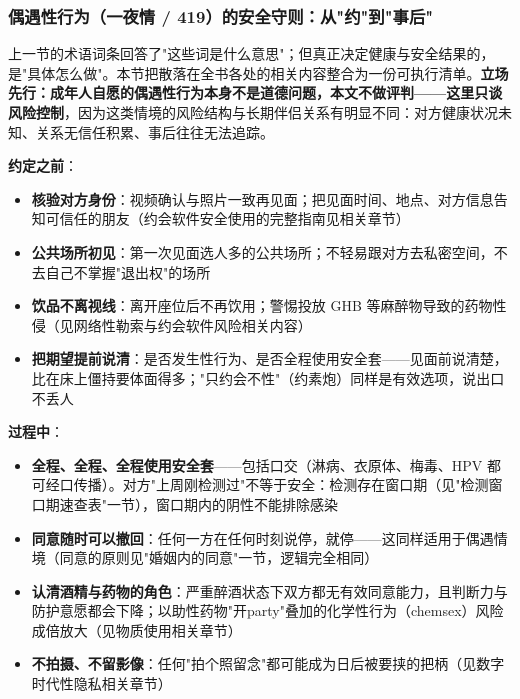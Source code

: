 \subsubsection{偶遇性行为（一夜情 / 419）的安全守则：从"约"到"事后"}

上一节的术语词条回答了"这些词是什么意思"；但真正决定健康与安全结果的，是"具体怎么做"。本节把散落在全书各处的相关内容整合为一份可执行清单。\textbf{立场先行：成年人自愿的偶遇性行为本身不是道德问题，本文不做评判——这里只谈风险控制}，因为这类情境的风险结构与长期伴侣关系有明显不同：对方健康状况未知、关系无信任积累、事后往往无法追踪。

\vspace{0.5em}
\noindent\textbf{约定之前}：

\begin{itemize}
	\item \textbf{核验对方身份}：视频确认与照片一致再见面；把见面时间、地点、对方信息告知可信任的朋友（约会软件安全使用的完整指南见相关章节）
	\item \textbf{公共场所初见}：第一次见面选人多的公共场所；不轻易跟对方去私密空间，不去自己不掌握"退出权"的场所
	\item \textbf{饮品不离视线}：离开座位后不再饮用；警惕投放 GHB 等麻醉物导致的药物性侵（见网络性勒索与约会软件风险相关内容）
	\item \textbf{把期望提前说清}：是否发生性行为、是否全程使用安全套——见面前说清楚，比在床上僵持要体面得多；"只约会不性"（约素炮）同样是有效选项，说出口不丢人
\end{itemize}

\vspace{0.5em}
\noindent\textbf{过程中}：

\begin{itemize}
	\item \textbf{全程、全程、全程使用安全套}——包括口交（淋病、衣原体、梅毒、HPV 都可经口传播）。对方"上周刚检测过"不等于安全：检测存在窗口期（见"检测窗口期速查表"一节），窗口期内的阴性不能排除感染
	\item \textbf{同意随时可以撤回}：任何一方在任何时刻说停，就停——这同样适用于偶遇情境（同意的原则见"婚姻内的同意"一节，逻辑完全相同）
	\item \textbf{认清酒精与药物的角色}：严重醉酒状态下双方都无有效同意能力，且判断力与防护意愿都会下降；以助性药物"开party"叠加的化学性行为（chemsex）风险成倍放大（见物质使用相关章节）
	\item \textbf{不拍摄、不留影像}：任何"拍个照留念"都可能成为日后被要挟的把柄（见数字时代性隐私相关章节）
\end{itemize}

